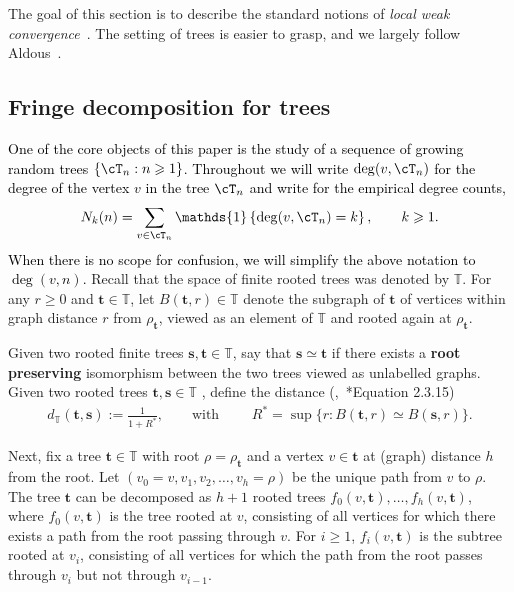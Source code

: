 \documentclass[letterpaper,11pt,reqno]{amsart}
\theoremstyle{definition}
\renewcommand{\ge}{\geqslant}
\renewcommand{\geq}{\geqslant}
\newcommand{\ind}{\mathds{1}}
\newcommand{\set}[1]{\left\{#1\right\}}
\newcommand{\bbT}{\mathbb{T}}
\newcommand{\bs}{\mathbf{s}}
\newcommand{\bt}{\mathbf{t}}
\begin{document}
The goal of this section is to describe the standard notions of \emph{local weak convergence}~\cites{aldous-steele-obj,benjamini-schramm,van2023random}. The setting of trees is easier to grasp, and we largely follow Aldous~\cite{aldous-fringe}.




 
\subsection{Fringe decomposition for trees}
 \textcolor{black}{One of the core objects of this paper is the study of a sequence of growing random trees $\set{\cT_n:n\geq 1}$. Throughout we will write $\deg(v,\cT_n)$ for the degree of the vertex $v$ in the tree $\cT_n$ and write for the empirical degree counts,  
\begin{equation}
    \label{eqn:deg-count}
    N_k(n) = \sum_{v\in \cT_n} \ind\set{\deg(v,\cT_n) = k }, \qquad k\geq 1.
\end{equation}
When there is no scope for confusion, we will simplify the above notation to $\deg(v,n)$.} Recall that the space of finite rooted trees was denoted by $\bbT$.  For any $r\geq 0$ and $\bt\in \bbT$, let $B(\bt, r) \in \bbT$ denote the subgraph of $\bt$ of vertices within graph distance $r$ from $\rho_{\bt}$, viewed as an element of $\bbT$ and rooted again at $\rho_{\bt}$. 

 Given two rooted finite trees $\bs, \bt \in \bbT$,  say that $\bs \simeq \bt $ if  there exists a {\bf root
preserving} isomorphism between the two trees viewed as unlabelled graphs. Given two rooted trees $\bt,\bs \in \bbT$ %
, define the distance (\cite{benjamini-schramm},~\cite{van2023random}*{Equation 2.3.15})
\begin{align}
\label{eqn:distance-trees}
	d_{\bbT}(\bt,\bs):= \frac{1}{1+R^*}, \qquad \text{with } \qquad R^* =\sup\{r: B(\bt, r) \simeq B(\bs, r)
	\}.
\end{align}

Next, fix a tree $\bt\in \bbT$ with root $\rho = \rho_\bt$ and a vertex $v\in \bt$ at (graph) distance $h$ from the root.  Let $(v_0 =v, v_1, v_2, \ldots, v_h = \rho)$ be the unique path from $v$ to $\rho$. The tree $\bt$  can be decomposed as $h+1$ rooted trees $f_0(v,\bt), \ldots, f_h(v,\bt)$, where $f_0(v,\bt)$ is the tree rooted at $v$, consisting of all vertices for which there exists a path from the root passing through $v$. For $i \ge 1$, $f_i(v,\bt)$ is the subtree rooted at $v_i$, consisting of all vertices for which the path from the root passes through $v_i$ but not through $v_{i-1}$. 
\end{document}
